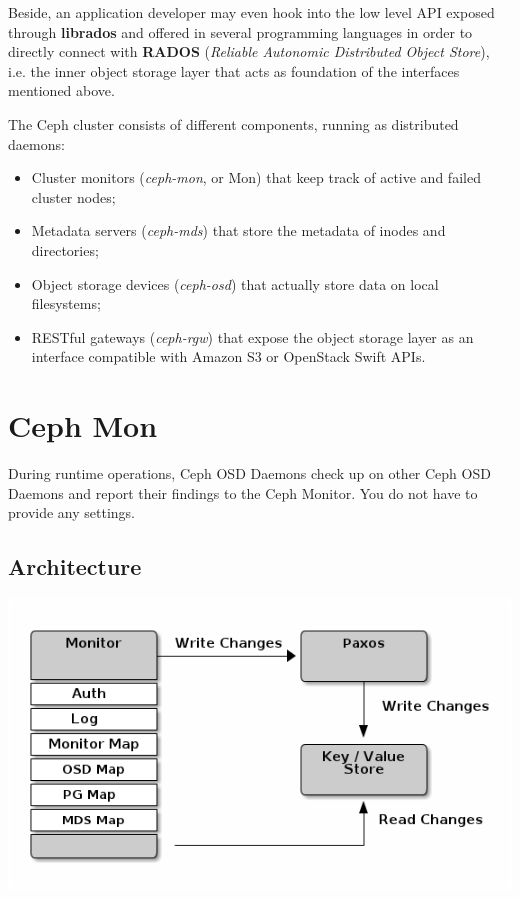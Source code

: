 \documentclass{article}
\begin{document}
Beside, an application developer may even hook into the low level API exposed through \textbf{librados} 
and offered in several programming languages in order to directly connect with \textbf{RADOS} 
(\textit{Reliable Autonomic Distributed Object Store}), i.e. the inner object storage layer
that acts as foundation of the interfaces mentioned above.

The Ceph cluster consists of different components, running as distributed daemons:
\begin{itemize}
	\item Cluster monitors (\textit{ceph-mon}, or Mon) that keep track of active and failed cluster nodes;
	\item Metadata servers (\textit{ceph-mds}) that store the metadata of inodes and directories;
    \item Object storage devices (\textit{ceph-osd}) that actually store data on local filesystems;
    \item RESTful gateways (\textit{ceph-rgw}) that expose the object storage layer as an interface 
    compatible with Amazon S3 or OpenStack Swift APIs.
\end{itemize}

\section{Ceph Mon}

During runtime operations, Ceph OSD Daemons check up on other Ceph OSD Daemons and report their findings to the Ceph Monitor. You do not have to provide any settings.


\subsection{Architecture}

\begin{center}
	\includegraphics[scale=0.50]{figs/ceph-mon-arch.png}
	\label{fig:monarch}
\end{center}
\end{document}
